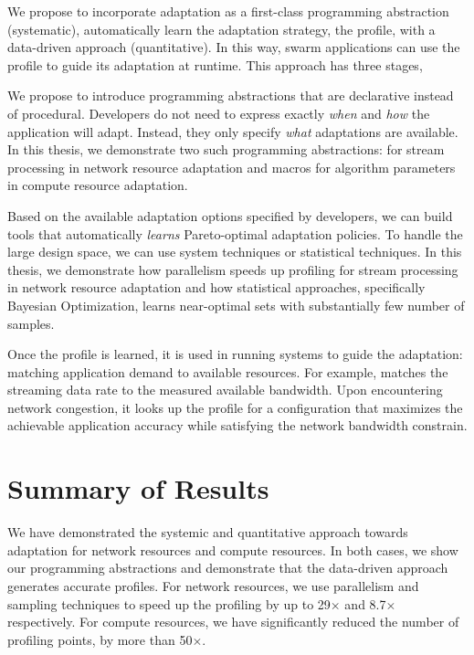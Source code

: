 \documentclass[thesis.tex]{subfiles}
\begin{document}
We propose to incorporate adaptation as a first-class programming abstraction
(systematic), automatically learn the adaptation strategy, the profile, with a
data-driven approach (quantitative). In this way, swarm applications can use the
profile to guide its adaptation at runtime. This approach has three stages,

 We propose to introduce programming
abstractions that are declarative instead of procedural. Developers do not need
to express exactly \emph{when} and \emph{how} the application will
adapt. Instead, they only specify \emph{what} adaptations are available. In this
thesis, we demonstrate two such programming abstractions: \maybe{} for stream
processing in network resource adaptation and macros for algorithm parameters in
compute resource adaptation.

 Based on the available adaptation
options specified by developers, we can build tools that automatically
\emph{learns} Pareto-optimal adaptation policies. To handle the large design
space, we can use system techniques or statistical techniques. In this thesis,
we demonstrate how parallelism speeds up profiling for stream processing in
network resource adaptation and how statistical approaches, specifically
Bayesian Optimization, learns near-optimal sets with substantially few number of
samples.

 Once the profile is learned, it is used in running
systems to guide the adaptation: matching application demand to available
resources. For example, \sysname{} matches the streaming data rate to the
measured available bandwidth. Upon encountering network congestion, it looks up
the profile for a configuration that maximizes the achievable application
accuracy while satisfying the network bandwidth constrain.

\section{Summary of Results}
\label{sec:summary-results-1}

We have demonstrated the systemic and quantitative approach towards adaptation
for network resources and compute resources. In both cases, we show our
programming abstractions and demonstrate that the data-driven approach generates
accurate profiles. For network resources, we use parallelism and sampling
techniques to speed up the profiling by up to 29$\times$ and 8.7$\times$
respectively. For compute resources, we have significantly reduced the number of
profiling points, by more than 50$\times$.
\end{document}

